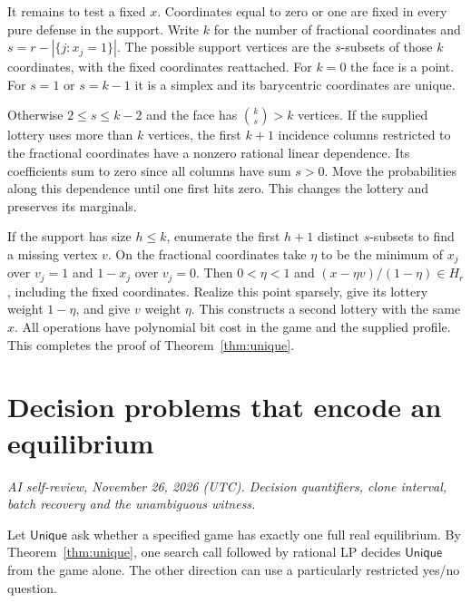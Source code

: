 \documentclass[11pt,oneside,openany,notitlepage]{report}
\newcommand{\Unique}{\mathsf{Unique}}
\newcommand{\reviewdate}{November 26, 2026 (UTC)}
\newcommand{\reviewmark}[1]{\par\nopagebreak[4]\noindent
  {\footnotesize\itshape AI self-review, \reviewdate. #1\par}\nobreak\smallskip}
\begin{document}
It remains to test a fixed \(x\). Coordinates equal to zero or one are fixed
in every pure defense in the support. Write \(k\) for the number of
fractional coordinates and \(s=r-|\{j:x_j=1\}|\). The possible support
vertices are the \(s\)-subsets of those \(k\) coordinates, with the fixed
coordinates reattached. For \(k=0\) the face is a point. For \(s=1\) or
\(s=k-1\) it is a simplex and its barycentric coordinates are unique.

Otherwise \(2\le s\le k-2\) and the face has \(\binom{k}{s}>k\) vertices.
If the supplied lottery uses more than \(k\) vertices, the first \(k+1\)
incidence columns restricted to the fractional coordinates have a nonzero
rational linear dependence. Its coefficients sum to zero since all columns
have sum \(s>0\). Move the probabilities along this dependence until one
first hits zero. This changes the lottery and preserves its marginals.

If the support has size \(h\le k\), enumerate the first \(h+1\) distinct
\(s\)-subsets to find a missing vertex \(v\). On the fractional coordinates
take \(\eta\) to be the minimum of \(x_j\) over \(v_j=1\) and \(1-x_j\)
over \(v_j=0\). Then \(0<\eta<1\) and
\((x-\eta v)/(1-\eta)\in H_r\), including the fixed coordinates.
Realize this point sparsely, give its lottery weight \(1-\eta\), and give
\(v\) weight \(\eta\). This constructs a second lottery with the same \(x\).
All operations have polynomial bit cost in the game and the supplied
profile. This completes the proof of Theorem~\ref{thm:unique}.

\chapter{Decision problems that encode an equilibrium}\label{sec:decisions}
\reviewmark{Decision quantifiers, clone interval, batch recovery and the unambiguous witness.}

Let \(\Unique\) ask whether a specified game has exactly one full real
equilibrium. By Theorem~\ref{thm:unique}, one search call followed by
rational LP decides \(\Unique\) from the game alone. The other direction
can use a particularly restricted yes/no question.
\end{document}
